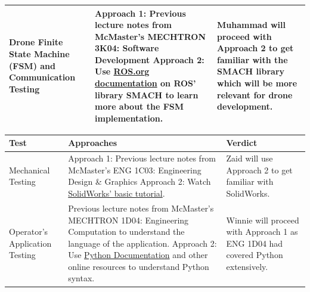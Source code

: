 \documentclass[12pt, titlepage]{article}
\begin{document}
\begin{table}[!h]
\begin{center}
\begin{tabular}{ | m{3cm} | m{7cm} | m{4cm} | }
\hline
Drone Finite State Machine (FSM) and Communication Testing & 
Approach 1: Previous lecture notes from McMaster's MECHTRON 3K04: Software Development \newline Approach 2: Use \href{http://wiki.ros.org/smach}{ROS.org documentation} on ROS' library SMACH to learn more about the FSM implementation. & Muhammad will proceed with Approach 2 to get familiar with the SMACH library which will be more relevant for drone development.\\
\hline
\end{tabular}
\end{center}
\end{table}

  
\begin{table}[!h]
\begin{center}
\label{RequiredTesting}

\begin{tabular}{ | m{3cm} | m{7cm} | m{4cm} | }

\hline
Test & Approaches & Verdict \\

\hline
Mechanical Testing & Approach 1: Previous lecture notes from McMaster's ENG 1C03: Engineering Design \& Graphics \newline Approach 2: Watch \href{https://www.youtube.com/watch?v=YmMDhzXitn0}{SolidWorks' basic tutorial}.& Zaid will use Approach 2 to get familiar with SolidWorks.\\  
\hline
Operator's Application Testing & Previous lecture notes from McMaster's MECHTRON 1D04: Engineering Computation  to understand the language of the application. \newline Approach 2: Use \href{https://docs.python.org/3/tutorial/}{Python Documentation} and other online resources to understand Python syntax. & Winnie will proceed with Approach 1 as ENG 1D04 had covered Python extensively.\\
\hline


\end{tabular}
\end{center}
\end{table}
\end{document}
